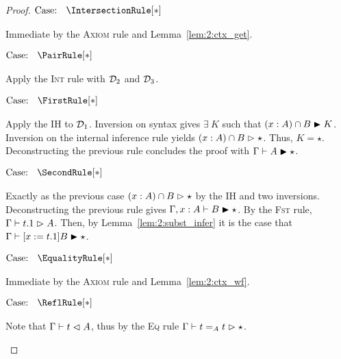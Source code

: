 \begin{proof}
    $\text{Case: }\begin{array}{c} \IntersectionRule[*] \end{array}$
    \begin{proofcase}
        Immediate by the \textsc{Axiom} rule and Lemma~\ref{lem:2:ctx_get}.
    \end{proofcase}

    $\text{Case: }\begin{array}{c} \PairRule[*] \end{array}$
    \begin{proofcase}
        Apply the \textsc{Int} rule with $\mathcal{D}_{2}$ and $\mathcal{D}_{3}$.
    \end{proofcase}

    $\text{Case: }\begin{array}{c} \FirstRule[*] \end{array}$
    \begin{proofcase}
        Apply the IH to $\mathcal{D}_{1}$.
        Inversion on syntax gives $\exists\ K$ such that $(x : A) \cap B \blacktriangleright K$.
        Inversion on the internal inference rule yields $(x : A) \cap B \vartriangleright \star$.
        Thus, $K = \star$.
        Deconstructing the previous rule concludes the proof with $\Gamma \vdash A \blacktriangleright \star$.
    \end{proofcase}

    $\text{Case: }\begin{array}{c} \SecondRule[*] \end{array}$
    \begin{proofcase}
        Exactly as the previous case $(x : A) \cap B \vartriangleright \star$ by the IH and two inversions.
        Deconstructing the previous rule gives $\Gamma, x : A \vdash B \blacktriangleright \star$.
        By the \textsc{Fst} rule, $\Gamma \vdash t.1 \vartriangleright A$.
        Then, by Lemma~\ref{lem:2:subst_infer} it is the case that $\Gamma \vdash [x := t.1]B \blacktriangleright \star$.
    \end{proofcase}

    $\text{Case: }\begin{array}{c} \EqualityRule[*] \end{array}$
    \begin{proofcase}
        Immediate by the \textsc{Axiom} rule and Lemma~\ref{lem:2:ctx_wf}.
    \end{proofcase}

    $\text{Case: }\begin{array}{c} \ReflRule[*] \end{array}$
    \begin{proofcase}
        Note that $\Gamma \vdash t \vartriangleleft A$, thus by the \textsc{Eq} rule $\Gamma \vdash t =_A t \vartriangleright \star$.
    \end{proofcase}


\end{proof}
